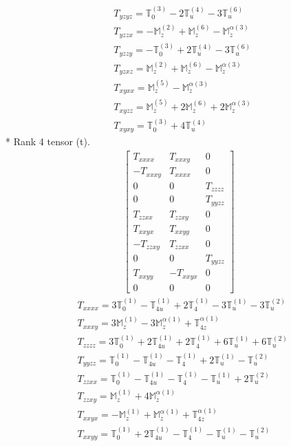 \documentclass[fleqn,8pt,landscape]{jsarticle}
\begin{document}
\begin{align*}
& T_{yzyz} = \mathbb{T}_{0}^{(3)} - 2 \mathbb{T}_{u}^{(4)} - 3 \mathbb{T}_{u}^{(6)} \\
& T_{yzzx} = - \mathbb{M}_{z}^{(2)} + \mathbb{M}_{z}^{(6)} - \mathbb{M}_{z}^{\alpha(3)} \\
& T_{yzzy} = - \mathbb{T}_{0}^{(3)} + 2 \mathbb{T}_{u}^{(4)} - 3 \mathbb{T}_{u}^{(6)} \\
& T_{yzxz} = \mathbb{M}_{z}^{(2)} + \mathbb{M}_{z}^{(6)} - \mathbb{M}_{z}^{\alpha(3)} \\
& T_{xyxx} = \mathbb{M}_{z}^{(5)} - \mathbb{M}_{z}^{\alpha(3)} \\
& T_{xyzz} = \mathbb{M}_{z}^{(5)} + 2 \mathbb{M}_{z}^{(6)} + 2 \mathbb{M}_{z}^{\alpha(3)} \\
& T_{xyxy} = \mathbb{T}_{0}^{(3)} + 4 \mathbb{T}_{u}^{(4)}
\end{align*}
* Rank 4 tensor (t).
\begin{align*}
\begin{bmatrix} T_{xxxx} & T_{xxxy} & 0 \\ - T_{xxxy} & T_{xxxx} & 0 \\ 0 & 0 & T_{zzzz} \\ 0 & 0 & T_{yyzz} \\ T_{zzxx} & T_{zzxy} & 0 \\ T_{xxyx} & T_{xxyy} & 0 \\ - T_{zzxy} & T_{zzxx} & 0 \\ 0 & 0 & T_{yyzz} \\ T_{xxyy} & - T_{xxyx} & 0 \\ 0 & 0 & 0 \end{bmatrix}
\end{align*}
\begin{align*}
& T_{xxxx} = 3 \mathbb{T}_{0}^{(1)} - \mathbb{T}_{4u}^{(1)} + 2 \mathbb{T}_{4}^{(1)} - 3 \mathbb{T}_{u}^{(1)} - 3 \mathbb{T}_{u}^{(2)} \\
& T_{xxxy} = 3 \mathbb{M}_{z}^{(1)} - 3 \mathbb{M}_{z}^{\alpha(1)} + \mathbb{T}_{4z}^{\alpha(1)} \\
& T_{zzzz} = 3 \mathbb{T}_{0}^{(1)} + 2 \mathbb{T}_{4u}^{(1)} + 2 \mathbb{T}_{4}^{(1)} + 6 \mathbb{T}_{u}^{(1)} + 6 \mathbb{T}_{u}^{(2)} \\
& T_{yyzz} = \mathbb{T}_{0}^{(1)} - \mathbb{T}_{4u}^{(1)} - \mathbb{T}_{4}^{(1)} + 2 \mathbb{T}_{u}^{(1)} - \mathbb{T}_{u}^{(2)} \\
& T_{zzxx} = \mathbb{T}_{0}^{(1)} - \mathbb{T}_{4u}^{(1)} - \mathbb{T}_{4}^{(1)} - \mathbb{T}_{u}^{(1)} + 2 \mathbb{T}_{u}^{(2)} \\
& T_{zzxy} = \mathbb{M}_{z}^{(1)} + 4 \mathbb{M}_{z}^{\alpha(1)} \\
& T_{xxyx} = - \mathbb{M}_{z}^{(1)} + \mathbb{M}_{z}^{\alpha(1)} + \mathbb{T}_{4z}^{\alpha(1)} \\
& T_{xxyy} = \mathbb{T}_{0}^{(1)} + 2 \mathbb{T}_{4u}^{(1)} - \mathbb{T}_{4}^{(1)} - \mathbb{T}_{u}^{(1)} - \mathbb{T}_{u}^{(2)}
\end{align*}
\end{document}
